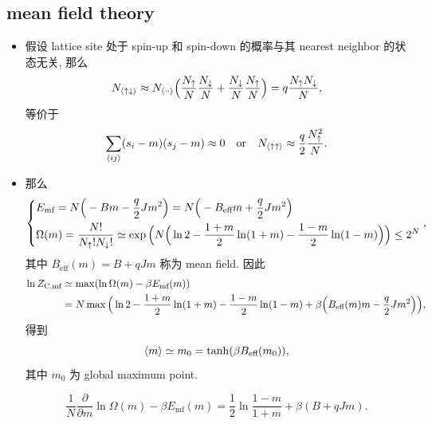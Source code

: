 \subsection{mean field theory}
\begin{itemize}
	\item 假设 lattice site 处于 spin-up 和 spin-down 的概率与其 nearest neighbor 的状态无关, 那么
	\begin{equation}
		N_{\braket{\uparrow \downarrow}} \approx N_{\braket{\cdot \cdot}} \Big( \frac{N_\uparrow}{N} \frac{N_\downarrow}{N} + \frac{N_\downarrow}{N} \frac{N_\uparrow}{N} \Big) = q \frac{N_\uparrow N_\downarrow}{N},
	\end{equation}
	等价于
	\begin{equation}
		\sum_{\braket{i j}} (s_i - m) (s_j - m) \approx 0 \quad \text{or} \quad N_{\braket{\uparrow \uparrow}} \approx \frac{q}{2} \frac{N_\uparrow^2}{N}.
	\end{equation}
	
	\item 那么
	\begin{equation}
		\begin{dcases}
			E_\text{mf} = N \Big( - B m - \frac{q}{2} J m^2 \Big) = N \Big( - B_\text{eff} m + \frac{q}{2} J m^2 \Big) \\
			\Omega(m) = \frac{N!}{N_\uparrow! N_\downarrow!} \simeq \exp \Big( N \Big( \ln 2 - \frac{1 + m}{2} \ln(1 + m) - \frac{1 - m}{2} \ln(1 - m) \Big) \Big) \leq 2^N
		\end{dcases},
	\end{equation}
	其中 $B_\text{eff}(m) = B + q J m$ 称为 mean field. 因此
	\begin{align}
		\ln Z_\text{C,mf} &\simeq \max(\ln \Omega(m) - \beta E_\text{mf}(m)) \notag \\
		&= N \max \Big( \ln 2 - \frac{1 + m}{2} \ln(1 + m) - \frac{1 - m}{2} \ln(1 - m) + \beta \Big( B_\text{eff}(m) m - \frac{q}{2} J m^2 \Big) \Big),
	\end{align}
	得到
	\begin{equation}
		\braket{m} \simeq m_0 = \tanh(\beta B_\text{eff}(m_0)),
	\end{equation}
	其中 $m_0$ 为 global maximum point.
	
	\begin{tcolorbox}[title=calculation:]
		\begin{equation}
			\frac{1}{N} \frac{\partial}{\partial m} \ln \Omega(m) - \beta E_\text{mf}(m) = \frac{1}{2} \ln \frac{1 - m}{1 + m} + \beta (B + q J m).
		\end{equation}
	\end{tcolorbox}
	

\end{itemize}
